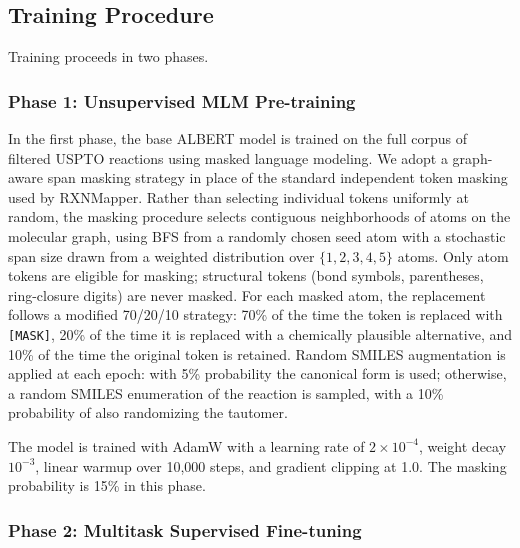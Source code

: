 \documentclass[12pt]{article}
\begin{document}
\subsection{Training Procedure}
\label{subsec:training}

Training proceeds in two phases.

\subsubsection{Phase 1: Unsupervised MLM Pre-training}
\label{subsubsec:pretrain}

In the first phase, the base ALBERT model is trained on the full
corpus of filtered USPTO reactions using masked language modeling.
We adopt a graph-aware span masking strategy in place of the standard
independent token masking used by RXNMapper.  Rather than selecting
individual tokens uniformly at random, the masking procedure selects
contiguous neighborhoods of atoms on the molecular graph, using BFS
from a randomly chosen seed atom with a stochastic span size drawn
from a weighted distribution over $\{1, 2, 3, 4, 5\}$ atoms.  Only
atom tokens are eligible for masking; structural tokens (bond symbols,
parentheses, ring-closure digits) are never masked.  For each masked
atom, the replacement follows a modified 70/20/10 strategy: 70\% of
the time the token is replaced with \texttt{[MASK]}, 20\% of the time
it is replaced with a chemically plausible alternative, and 10\% of the time the
original token is retained.  Random SMILES augmentation is applied
at each epoch: with 5\% probability the canonical form is used;
otherwise, a random SMILES enumeration of the reaction is sampled,
with a 10\% probability of also randomizing the tautomer.

The model is trained with AdamW with a learning rate of
$2 \times 10^{-4}$, weight decay $10^{-3}$, linear warmup over
10,000 steps, and gradient clipping at 1.0.  The masking probability
is 15\% in this phase.

\subsubsection{Phase 2: Multitask Supervised Fine-tuning}
\label{subsubsec:finetune}
\end{document}
